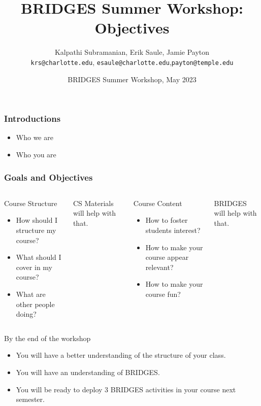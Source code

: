 \documentclass[aspectratio=169]{beamer}
\title[Objectives]{BRIDGES Summer Workshop:\\Objectives}
\subtitle{}
\author{Kalpathi Subramanian, Erik Saule, Jamie Payton\\\texttt{krs@charlotte.edu}, \texttt{esaule@charlotte.edu},\texttt{payton@temple.edu}}
\institute{The University of North Carolina at Charlotte}
\date{BRIDGES Summer Workshop, May 2023}
\begin{document}
\begin{frame}
\titlepage

\end{frame}


\begin{frame}
  \frametitle{Introductions}

  \begin{itemize}
  \item Who we are
  \item Who you are
  \end{itemize}
\end{frame}

\begin{frame}
  \frametitle{Goals and Objectives}

  \begin{columns}
    \begin{block}{Course Structure}
      \begin{itemize}
      \item How should I structure my course?
      \item What should I cover in my course?
      \item What are other people doing?
      \end{itemize}
    \end{block}

    CS Materials will help with that.
    
    \begin{block}{Course Content}
      \begin{itemize}
      \item How to foster students interest?
      \item How to make your course appear relevant?
      \item How to make your course fun?
      \end{itemize}
    \end{block}

   BRIDGES will help with that.
  \end{columns}

  \begin{block}{By the end of the workshop}
    \begin{itemize}
    \item You will have a better understanding of the structure of your class.
    \item You will have an understanding of BRIDGES.
    \item You will be ready to deploy 3 BRIDGES activities in your course next semester.
    \end{itemize}
  \end{block}

  
\end{frame}
\end{document}
